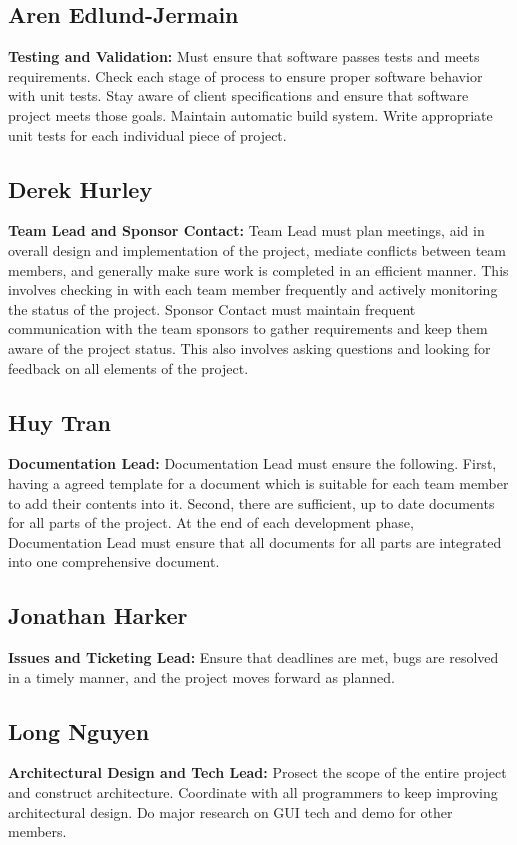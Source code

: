\documentclass[12pt, letterpaper]{article}
\begin{document}
  \subsection{Aren Edlund-Jermain}
  {\bf Testing and Validation:} Must ensure that software passes tests and meets requirements. Check each stage of process to ensure proper software behavior with unit tests. Stay aware of client specifications and ensure that software project meets those goals. Maintain automatic build system. Write appropriate unit tests for each individual piece of project.
  \subsection{Derek Hurley}
  {\bf Team Lead and Sponsor Contact:} Team Lead must plan meetings, aid in overall design and implementation of the project, mediate conflicts between team members, and generally make sure work is completed in an efficient manner. This involves checking in with each team member frequently and actively monitoring the status of the project. Sponsor Contact must maintain frequent communication with the team sponsors to gather requirements and keep them aware of the project status. This also involves asking questions and looking for feedback on all elements of the project.
  \subsection{Huy Tran}
  {\bf Documentation Lead:} Documentation Lead must ensure the following. First, having a agreed template for a document which is suitable for each team member to add their contents into it. Second, there are sufficient, up to date documents for all parts of the project. At the end of each development phase, Documentation Lead must ensure that all documents for all parts are integrated into one comprehensive document.
  \subsection{Jonathan Harker}
  {\bf Issues and Ticketing Lead:} Ensure that deadlines are met, bugs are resolved in a timely manner, and the project moves forward as planned.
  \subsection{Long Nguyen}
  {\bf Architectural Design and Tech Lead:} Prosect the scope of the entire project and construct architecture. Coordinate with all programmers to keep improving architectural design. Do major research on GUI tech and demo for other members.
\end{document}
